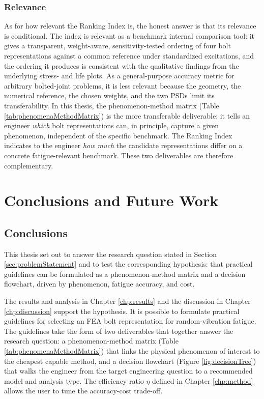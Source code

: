 \documentclass[a4paper,twoside]{bth}
\begin{document}
\subsection{Relevance}
As for how relevant the Ranking Index is, the honest answer is that its relevance is conditional. The index is relevant as a benchmark internal comparison tool: it gives a transparent, weight-aware, sensitivity-tested ordering of four bolt representations against a common reference under standardized excitations, and the ordering it produces is consistent with the qualitative findings from the underlying stress- and life plots. As a general-purpose accuracy metric for arbitrary bolted-joint problems, it is less relevant because the geometry, the numerical reference, the chosen weights, and the two PSDs limit its transferability. In this thesis, the phenomenon-method matrix (Table \ref{tab:phenomenaMethodMatrix}) is the more transferable deliverable: it tells an engineer \textit{which} bolt representations can, in principle, capture a given phenomenon, independent of the specific benchmark. The Ranking Index indicates to the engineer \textit{how much} the candidate representations differ on a concrete fatigue-relevant benchmark. These two deliverables are therefore complementary.

\chapter{Conclusions and Future Work} \label{chp:conclusions}

\section{Conclusions}
This thesis set out to answer the research question stated in Section \ref{sec:problemStatement} and to test the corresponding hypothesis: that practical guidelines can be formulated as a phenomenon-method matrix and a decision flowchart, driven by phenomenon, fatigue accuracy, and cost.

The results and analysis in Chapter \ref{chp:results} and the discussion in Chapter \ref{chp:discussion} support the hypothesis. It is possible to formulate practical guidelines for selecting an \ac{FEA} bolt representation for random-vibration fatigue. The guidelines take the form of two deliverables that together answer the research question: a phenomenon-method matrix (Table \ref{tab:phenomenaMethodMatrix}) that links the physical phenomenon of interest to the cheapest capable method, and a decision flowchart (Figure \ref{fig:decisionTree}) that walks the engineer from the target engineering question to a recommended model and analysis type. The efficiency ratio $\eta$ defined in Chapter \ref{chp:method} allows the user to tune the accuracy-cost trade-off.
\end{document}
